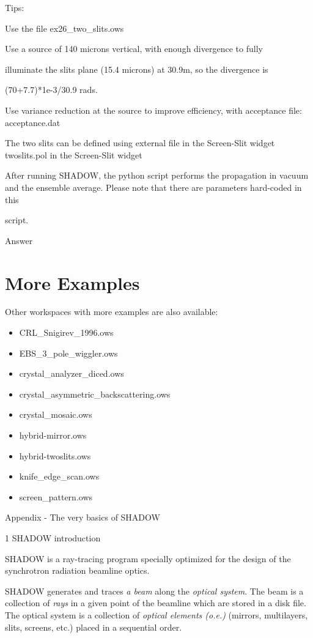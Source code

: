 \documentclass[]{article}
\begin{document}
Tips:

Use the file ex26\_two\_slits.ows

Use a source of 140 microns vertical, with enough divergence to fully

illuminate the slits plane (15.4 microns) at 30.9m, so the divergence is

(70+7.7)*1e-3/30.9 rads.

Use variance reduction at the source to improve efficiency, with
acceptance file: acceptance.dat

The two slits can be defined using external file in the Screen-Slit
widget twoslits.pol in the Screen-Slit widget

After running SHADOW, the python script performs the propagation in
vacuum and the ensemble average. Please note that there are parameters
hard-coded in this

script.

Answer

\section{More Examples}\label{more-examples}

Other workspaces with more examples are also available:

\begin{itemize}
\item
  CRL\_Snigirev\_1996.ows 
\item
  EBS\_3\_pole\_wiggler.ows 
\item
  crystal\_analyzer\_diced.ows 
\item
  crystal\_asymmetric\_backscattering.ows 
\item
  crystal\_mosaic.ows 
\item
  hybrid-mirror.ows 
\item
  hybrid-twoslits.ows 
\item
  knife\_edge\_scan.ows 
\item
  screen\_pattern.ows 
\end{itemize}

Appendix - The very basics of SHADOW

1 SHADOW introduction

SHADOW is a ray-tracing program specially optimized for the design of
the synchrotron radiation beamline optics.

SHADOW generates and traces \emph{a beam }along the \emph{optical
system}. The beam is a collection of \emph{rays }in a given point of the
beamline which are stored in a disk file. The optical system is a
collection of \emph{optical elements (o.e.) }(mirrors, multilayers,
slits, screens, etc.) placed in a sequential order.
\end{document}
